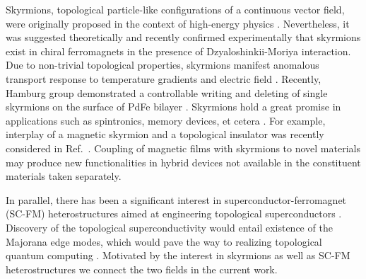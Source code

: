\documentclass[twocolumn,showpacs,floatfix,longbibliography]{revtex4-1}
\begin{document}
Skyrmions, topological particle-like configurations of a continuous vector field, were originally proposed in the context of high-energy physics \cite{Skyrme}.  Nevertheless, it was suggested theoretically \cite{Bogdanov1989,Rossler2006} and recently confirmed experimentally \cite{Muhlbauer2009,Munzer2010,Yu2011,Heinze2011,Seki2012} that skyrmions exist in chiral ferromagnets in the presence of Dzyaloshinkii-Moriya interaction. Due to non-trivial topological properties, skyrmions manifest anomalous transport response to temperature gradients \cite{Jonietz2010} and electric field \cite{Neubauer2009,Zang2011,Saxena2013}. Recently, Hamburg group demonstrated a controllable writing and deleting of single skyrmions on the surface of PdFe bilayer \cite{Romming2013,Bergmann2014,Romming2015}.  Skyrmions hold a great promise in applications such as spintronics, memory devices, et cetera \cite{Fert2013,Nagaosa2013}. For example, interplay of a magnetic skyrmion and a topological insulator was recently considered in Ref.~\cite{Hurst2015}. Coupling of magnetic films with skyrmions to novel materials may produce new functionalities in hybrid devices not available in the constituent materials taken separately.


In parallel, there has been a significant interest in superconductor-ferromagnet (SC-FM) heterostructures aimed at engineering topological superconductors \cite{Alicea2012,Beenakker}. Discovery of the topological superconductivity would entail existence of the Majorana edge modes, which would pave the way to realizing topological quantum computing \cite{Nayak2008}. Motivated by the interest in skyrmions as well as SC-FM heterostructures  we connect the two fields in the current work.
\end{document}
